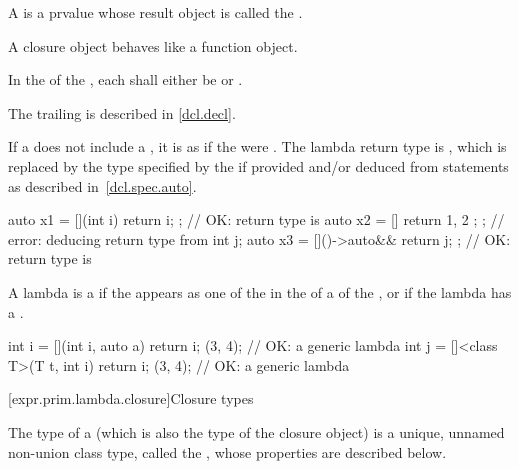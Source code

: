 \pnum
A  is a prvalue
whose result object is called the .
\begin{note}
A closure object behaves like a function
object.\end{note}

\pnum
In the  of the ,
each 
shall either be  or .
\begin{note}
The trailing  is described in \ref{dcl.decl}.
\end{note}

\pnum
If a  does not include a
, it is as if the  were
\tcode{()}.
The lambda return type is , which is replaced by the
type specified by the
 if provided and/or deduced from
 statements as described in~\ref{dcl.spec.auto}.
\begin{example}
\begin{codeblock}
auto x1 = [](int i){ return i; };     // OK: return type is 
auto x2 = []{ return { 1, 2 }; };     // error: deducing return type from 
int j;
auto x3 = []()->auto&& { return j; }; // OK: return type is 
\end{codeblock}
\end{example}

\pnum
A lambda is a 
if the   appears as one of the
 in the  of a
 of the ,
or if the lambda has a .
\begin{example}
\begin{codeblock}
int i = [](int i, auto a) { return i; }(3, 4);         // OK: a generic lambda
int j = []<class T>(T t, int i) { return i; }(3, 4);   // OK: a generic lambda
\end{codeblock}
\end{example}

[expr.prim.lambda.closure]{Closure types}%

\pnum
The type of a  (which is also the type of the
closure object) is a unique, unnamed non-union class type,
called the ,
whose properties are described below.

